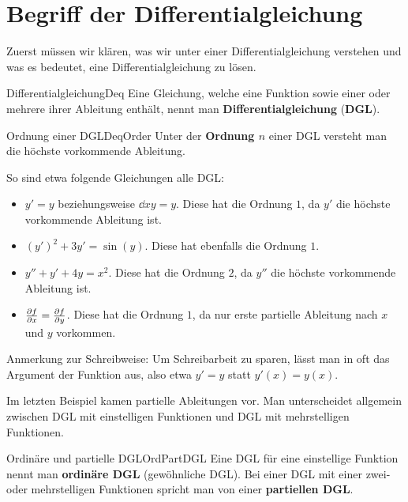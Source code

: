 \section{Begriff der Differentialgleichung}

Zuerst müssen wir klären, was wir unter einer Differentialgleichung verstehen und was es bedeutet, eine Differentialgleichung zu lösen.

\begin{definition}{Differentialgleichung}{Deq}
    Eine Gleichung, welche eine Funktion sowie einer oder mehrere ihrer Ableitung enthält, nennt man \textbf{Differentialgleichung} (\textbf{DGL}).
\end{definition}

\begin{definition}{Ordnung einer DGL}{DeqOrder}
    Unter der \textbf{Ordnung $n$} einer DGL versteht man die höchste vorkommende Ableitung.
\end{definition}

So sind etwa folgende Gleichungen alle DGL:

\begin{itemize}
    \item $y' = y$ beziehungsweise $\dd{}{x} y = y$. Diese hat die Ordnung $1$, da $y'$ die höchste vorkommende Ableitung ist.
    \item $(y')^2 + 3 y' = \sin(y)$. Diese hat ebenfalls die Ordnung $1$.
    \item $y''+y'+4y=x^2$. Diese hat die Ordnung $2$, da $y''$ die höchste vorkommende Ableitung ist.
    \item $\frac{\partial f}{\partial x} = \frac{\partial f}{\partial y}$. Diese hat die Ordnung $1$, da nur erste partielle Ableitung nach $x$ und $y$ vorkommen.
\end{itemize}

Anmerkung zur Schreibweise: Um Schreibarbeit zu sparen, lässt man in oft das Argument der Funktion aus, also etwa $y'=y$ statt $y'(x) = y(x)$.

Im letzten Beispiel kamen partielle Ableitungen vor. Man unterscheidet allgemein zwischen DGL mit einstelligen Funktionen und DGL mit mehrstelligen Funktionen.

\begin{definition}{Ordinäre und partielle DGL}{OrdPartDGL}
    Eine DGL für eine einstellige Funktion nennt man \textbf{ordinäre DGL} (gewöhnliche DGL). Bei einer DGL mit einer zwei- oder mehrstelligen Funktionen spricht man von einer \textbf{partiellen DGL}.
\end{definition}

